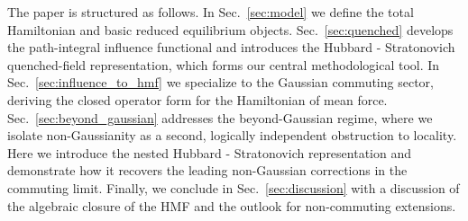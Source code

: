 The paper is structured as follows. In Sec.~\ref{sec:model} we define the total Hamiltonian and basic reduced equilibrium objects. Sec.~\ref{sec:quenched} develops the path-integral influence functional and introduces the Hubbard - Stratonovich quenched-field representation, which forms our central methodological tool. In Sec.~\ref{sec:influence_to_hmf} we specialize to the Gaussian commuting sector, deriving the closed operator form for the Hamiltonian of mean force. Sec.~\ref{sec:beyond_gaussian} addresses the beyond-Gaussian regime, where we isolate non-Gaussianity as a second, logically independent obstruction to locality. Here we introduce the nested Hubbard - Stratonovich representation and demonstrate how it recovers the leading non-Gaussian corrections in the commuting limit. Finally, we conclude in Sec.~\ref{sec:discussion} with a discussion of the algebraic closure of the HMF and the outlook for non-commuting extensions.

